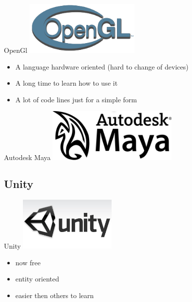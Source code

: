 \documentclass[a4paper,10pt]{beamer}
\begin{document}
			\begin{frame}{OpenGl}
				\includegraphics[height=75pt]{images/logos/OpenGL_logo.png}
				\begin{itemize}
					\item A language hardware oriented (hard to change of devices)
					\item A long time to learn how to use it
					\item A lot of code lines just for a simple form
				\end{itemize}
			\end{frame}
			
			\begin{frame}{Autodesk Maya}
				\includegraphics[height=75pt]{images/logos/Autodesk_Maya.png}
			\end{frame}
			
		\subsection{Unity}
		
			\begin{frame}{Unity}
				\includegraphics[height=75pt]{images/logos/Logo_Unity.jpg}
				\begin{itemize}
					\item now free
					\item entity oriented
					\item easier then others to learn
				\end{itemize}
			\end{frame}
			
\end{document}
